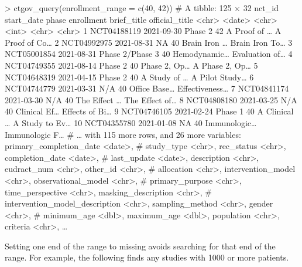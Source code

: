 \begin{example}
> ctgov_query(enrollment_range = c(40, 42))
# A tibble: 125 × 32
   nct_id      start_date phase           enrollment brief_title  official_title
   <chr>       <date>     <chr>                <int> <chr>        <chr>
 1 NCT04188119 2021-09-30 Phase 2                 42 A Proof of … A Proof of Co…
 2 NCT04992975 2021-08-31 NA                      40 Brain Iron … Brain Iron To…
 3 NCT05001854 2021-08-31 Phase 2/Phase 3         40 Hemodynamic… Evaluation of…
 4 NCT04749355 2021-08-14 Phase 2                 40 Phase 2, Op… A Phase 2, Op…
 5 NCT04648319 2021-04-15 Phase 2                 40 A Study of … A Pilot Study…
 6 NCT04744779 2021-03-31 N/A                     40 Office Base… Effectiveness…
 7 NCT04841174 2021-03-30 N/A                     40 The Effect … The Effect of…
 8 NCT04808180 2021-03-25 N/A                     40 Clinical Ef… Effects of Bi…
 9 NCT04746105 2021-02-24 Phase 1                 40 A Clinical … A Study to Ev…
10 NCT04355780 2021-01-08 NA                      40 Immunologic… Immunologic F…
# … with 115 more rows, and 26 more variables: primary_completion_date <date>,
#   study_type <chr>, rec_status <chr>, completion_date <date>,
#   last_update <date>, description <chr>, eudract_num <chr>, other_id <chr>,
#   allocation <chr>, intervention_model <chr>, observational_model <chr>,
#   primary_purpose <chr>, time_perspective <chr>, masking_description <chr>,
#   intervention_model_description <chr>, sampling_method <chr>, gender <chr>,
#   minimum_age <dbl>, maximum_age <dbl>, population <chr>, criteria <chr>, …
\end{example}

Setting one end of the range to missing avoids searching for that end of the
range. For example, the following finds any studies with 1000 or more patients.

